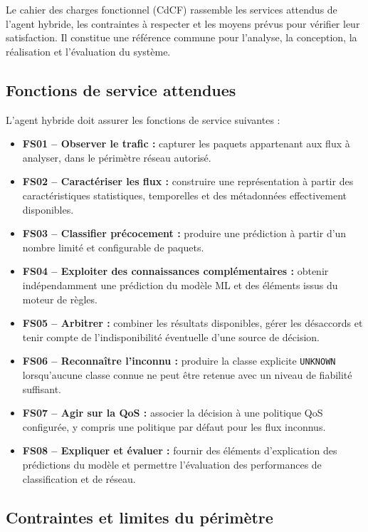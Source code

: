 Le cahier des charges fonctionnel (CdCF) rassemble les services attendus
de l'agent hybride, les contraintes à respecter et les moyens prévus
pour vérifier leur satisfaction. Il constitue une référence commune
pour l'analyse, la conception, la réalisation et l'évaluation du système.

\subsection{Fonctions de service attendues}

L'agent hybride doit assurer les fonctions de service suivantes :

\begin{itemize}
    \item \textbf{FS01 -- Observer le trafic :} capturer les paquets
    appartenant aux flux à analyser, dans le périmètre réseau autorisé.
    \item \textbf{FS02 -- Caractériser les flux :} construire une
    représentation à partir des caractéristiques statistiques,
    temporelles et des métadonnées effectivement disponibles.
    \item \textbf{FS03 -- Classifier précocement :} produire une
    prédiction à partir d'un nombre limité et configurable de paquets.
    \item \textbf{FS04 -- Exploiter des connaissances complémentaires :}
    obtenir indépendamment une prédiction du modèle ML et des éléments
    issus du moteur de règles.
    \item \textbf{FS05 -- Arbitrer :} combiner les résultats disponibles,
    gérer les désaccords et tenir compte de l'indisponibilité éventuelle
    d'une source de décision.
    \item \textbf{FS06 -- Reconnaître l'inconnu :} produire la classe
    explicite \texttt{UNKNOWN} lorsqu'aucune classe connue ne peut être
    retenue avec un niveau de fiabilité suffisant.
    \item \textbf{FS07 -- Agir sur la QoS :} associer la décision à une
    politique QoS configurée, y compris une politique par défaut pour
    les flux inconnus.
    \item \textbf{FS08 -- Expliquer et évaluer :} fournir des éléments
    d'explication des prédictions du modèle et permettre l'évaluation
    des performances de classification et de réseau.
\end{itemize}

\subsection{Contraintes et limites du périmètre}

